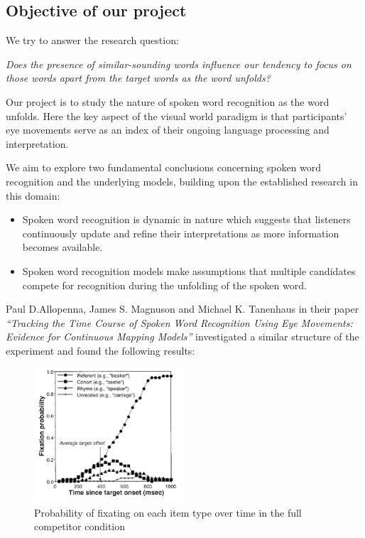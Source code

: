 \documentclass[
  a4paper,
]{article}
\providecommand{\tightlist}{%
  \setlength{\itemsep}{0pt}\setlength{\parskip}{0pt}}\usepackage{longtable,booktabs,array}
\begin{document}
\hypertarget{objective-of-our-project}{%
\subsection{Objective of our project}\label{objective-of-our-project}}

We try to answer the research question:

\emph{Does the presence of similar-sounding words influence our tendency
to focus on those words apart from the target words as the word
unfolds?}

Our project is to study the nature of spoken word recognition as the
word unfolds. Here the key aspect of the visual world paradigm is that
participants' eye movements serve as an index of their ongoing language
processing and interpretation.

We aim to explore two fundamental conclusions concerning spoken word
recognition and the underlying models, building upon the established
research in this domain:

\begin{itemize}
\tightlist
\item
  Spoken word recognition is dynamic in nature which suggests that
  listeners continuously update and refine their interpretations as more
  information becomes available.
\item
  Spoken word recognition models make assumptions that multiple
  candidates compete for recognition during the unfolding of the spoken
  word.
\end{itemize}

Paul D.Allopenna, James S. Magnuson and Michael K. Tanenhaus in their
paper \emph{``Tracking the Time Course of Spoken Word Recognition Using
Eye Movements: Evidence for Continuous Mapping Models''} investigated a
similar structure of the experiment and found the following results:

\begin{figure}

{\centering \includegraphics[width=0.5\textwidth,height=\textheight]{img/ref_graph.png}

}

\caption{\label{fig-matrix}Probability of fixating on each item type
over time in the full competitor condition}

\end{figure}
\end{document}
